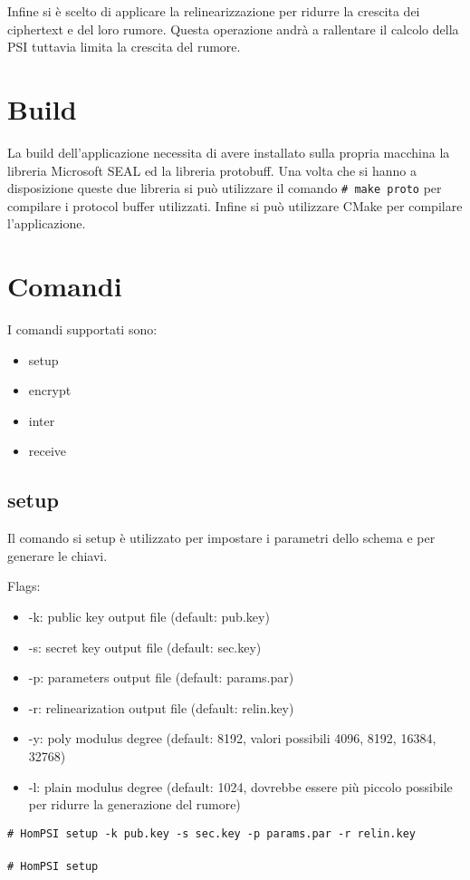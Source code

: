 \documentclass[]{article}
\newcommand{\shellcmd}[1]{\texttt{\footnotesize\# #1}}
\begin{document}
Infine si è scelto di applicare la relinearizzazione per ridurre la crescita dei ciphertext e del loro rumore. Questa operazione andrà a rallentare il calcolo della PSI tuttavia limita la crescita del rumore. 

\section{Build}
La build dell'applicazione necessita di avere installato sulla propria macchina la libreria Microsoft SEAL ed la libreria protobuff. Una volta che si hanno a disposizione queste due libreria si può utilizzare il comando \shellcmd{make proto} per compilare i protocol buffer utilizzati. Infine si può utilizzare CMake per compilare l'applicazione. 

\section{Comandi}
I comandi supportati sono:

\begin{itemize}
	\item setup
	\item encrypt
	\item inter
	\item receive
\end{itemize}

\subsection{setup}
Il comando si setup è utilizzato per impostare i parametri dello schema e per generare le chiavi.

Flags:

\begin{itemize}
	\item -k: public key output file (default: pub.key)
	\item -s: secret key output file (default: sec.key)
	\item -p: parameters output file (default: params.par)
	\item -r: relinearization output file (default: relin.key)
	\item -y: poly modulus degree (default: 8192, valori possibili {4096, 8192, 16384, 32768})
	\item -l: plain modulus degree (default: 1024, dovrebbe essere più piccolo possibile per ridurre la generazione del rumore)
\end{itemize}
\shellcmd{HomPSI setup -k pub.key -s sec.key -p params.par -r relin.key}\\
\\\shellcmd{HomPSI setup}
\end{document}
